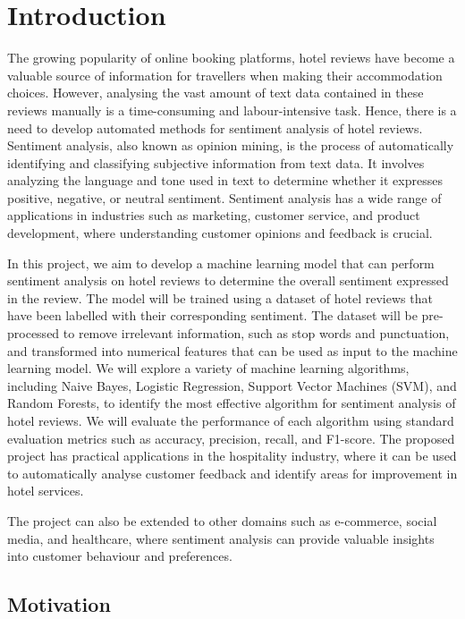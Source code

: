 \documentclass[a4paper, 12pt]{report}
\begin{document}
\chapter{Introduction}
\par The growing popularity of online booking platforms, hotel reviews have become a valuable source of 
information for travellers when making their accommodation choices. However, analysing the vast amount of 
text data contained in these reviews manually is a time-consuming and labour-intensive task. Hence, there is a 
need to develop automated methods for sentiment analysis of hotel reviews. Sentiment analysis, also known as 
opinion mining, is the process of automatically identifying and classifying subjective information from text data. 
It involves analyzing the language and tone used in text to determine whether it expresses positive, negative, or 
neutral sentiment. Sentiment analysis has a wide range of applications in industries such as marketing, 
customer service, and product development, where understanding customer opinions and feedback is crucial.
\\
\par In this project, we aim to develop a machine learning model that can perform sentiment analysis on hotel 
reviews to determine the overall sentiment expressed in the review. The model will be trained using a dataset 
of hotel reviews that have been labelled with their corresponding sentiment. The dataset will be pre-processed 
to remove irrelevant information, such as stop words and punctuation, and transformed into numerical 
features that can be used as input to the machine learning model.
We will explore a variety of machine learning algorithms, including Naive Bayes, Logistic Regression, Support 
Vector Machines (SVM), and Random Forests, to identify the most effective algorithm for sentiment analysis of 
hotel reviews. We will evaluate the performance of each algorithm using standard evaluation metrics such as 
accuracy, precision, recall, and F1-score.
The proposed project has practical applications in the hospitality industry, where it can be used to 
automatically analyse customer feedback and identify areas for improvement in hotel services.
\\ 
\par The project can 
also be extended to other domains such as e-commerce, social media, and healthcare, where sentiment analysis 
can provide valuable insights into customer behaviour and preferences.
\section{Motivation}
\end{document}
